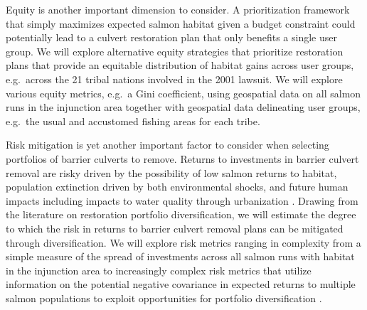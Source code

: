 \documentclass[12pt]{elsarticle}
\begin{document}
	Equity is another important dimension to consider. A prioritization framework that simply maximizes expected salmon habitat given a budget constraint could potentially lead to a culvert restoration plan that only benefits a single user group. We will explore alternative equity strategies that prioritize restoration plans that provide an equitable distribution of habitat gains across user groups, e.g.\ across the 21 tribal nations involved in the 2001 lawsuit. We will explore various equity metrics, e.g.\ a Gini coefficient, using geospatial data on all salmon runs in the injunction area together with geospatial data delineating user groups, e.g.\ the usual and accustomed fishing areas for each tribe. 
	
	Risk mitigation is yet another important factor to consider when selecting portfolios of barrier culverts to remove. Returns to investments in barrier culvert removal are risky driven by the possibility of low salmon returns to habitat, population extinction driven by both environmental shocks, and future human impacts including impacts to water quality through urbanization \citep{ettinger2021prioritizing}. Drawing from the literature on restoration portfolio diversification, we will estimate the degree to which the risk in returns to barrier culvert removal plans can be mitigated through diversification. We will explore risk metrics ranging in complexity from a simple measure of the spread of investments across all salmon runs with habitat in the injunction area to increasingly complex risk metrics that utilize information on the potential negative covariance in expected returns to multiple salmon populations to exploit opportunities for portfolio diversification \citep{sanchirico2008empirical, jardine2015fishermen, johnston2002combining}.  
	
	
\end{document}
